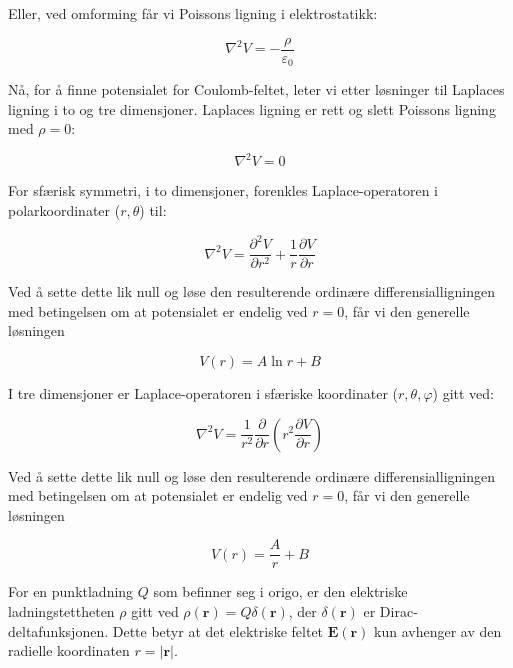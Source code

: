 Eller, ved omforming får vi Poissons ligning i elektrostatikk:

\begin{equation*}
\nabla^2 V = - \frac{\rho}{\varepsilon_0}
\end{equation*}

Nå, for å finne potensialet for Coulomb-feltet, leter vi etter løsninger til Laplaces ligning i to og tre dimensjoner. Laplaces ligning er rett og slett Poissons ligning med $\rho = 0$:

\begin{equation*}
\nabla^2 V = 0
\end{equation*}

For sfærisk symmetri, i to dimensjoner, forenkles Laplace-operatoren i polarkoordinater ($r, \theta$) til:

\begin{equation*}
\nabla^2 V = \frac{\partial^2 V}{\partial r^2} + \frac{1}{r} \frac{\partial V}{\partial r}
\end{equation*}

Ved å sette dette lik null og løse den resulterende ordinære differensialligningen med betingelsen om at potensialet er endelig ved $r=0$, får vi den generelle løsningen

\begin{equation*}
V(r) = A \ln r + B
\end{equation*}

I tre dimensjoner er Laplace-operatoren i sfæriske koordinater ($r, \theta, \varphi$) gitt ved:

\begin{equation*}
\nabla^2 V = \frac{1}{r^2} \frac{\partial}{\partial r} \left(r^2 \frac{\partial V}{\partial r} \right)
\end{equation*}

Ved å sette dette lik null og løse den resulterende ordinære differensialligningen med betingelsen om at potensialet er endelig ved $r=0$, får vi den generelle løsningen

\begin{equation*}
V(r) = \frac{A}{r} + B
\end{equation*}

For en punktladning $Q$ som befinner seg i origo, er den elektriske ladningstettheten $\rho$ gitt ved $\rho(\mathbf{r}) = Q \delta(\mathbf{r})$, der $\delta(\mathbf{r})$ er Dirac-deltafunksjonen. Dette betyr at det elektriske feltet $\mathbf{E}(\mathbf{r})$ kun avhenger av den radielle koordinaten $r = |\mathbf{r}|$.

